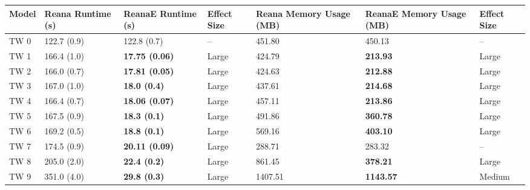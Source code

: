 \begin{tabular}{lllllll}
\toprule
Model & Reana Runtime (s) &    ReanaE Runtime (s) & Effect Size & Reana Memory Usage (MB) & ReanaE Memory Usage (MB) & Effect Size \\
\midrule
 TW 0 &       122.7 (0.9) &           122.8 (0.7) &          -- &                  451.80 &                   450.13 &          -- \\
 TW 1 &       166.4 (1.0) & \textbf{17.75 (0.06)} &       Large &                  424.79 &          \textbf{213.93} &       Large \\
 TW 2 &       166.0 (0.7) & \textbf{17.81 (0.05)} &       Large &                  424.63 &          \textbf{212.88} &       Large \\
 TW 3 &       167.0 (1.0) &   \textbf{18.0 (0.4)} &       Large &                  437.61 &          \textbf{214.68} &       Large \\
 TW 4 &       166.4 (0.7) & \textbf{18.06 (0.07)} &       Large &                  457.11 &          \textbf{213.86} &       Large \\
 TW 5 &       167.5 (0.9) &   \textbf{18.3 (0.1)} &       Large &                  491.86 &          \textbf{360.78} &       Large \\
 TW 6 &       169.2 (0.5) &   \textbf{18.8 (0.1)} &       Large &                  569.16 &          \textbf{403.10} &       Large \\
 TW 7 &       174.5 (0.9) & \textbf{20.11 (0.09)} &       Large &                  288.71 &                   283.32 &          -- \\
 TW 8 &       205.0 (2.0) &   \textbf{22.4 (0.2)} &       Large &                  861.45 &          \textbf{378.21} &       Large \\
 TW 9 &       351.0 (4.0) &   \textbf{29.8 (0.3)} &       Large &                 1407.51 &         \textbf{1143.57} &      Medium \\
\bottomrule
\end{tabular}
